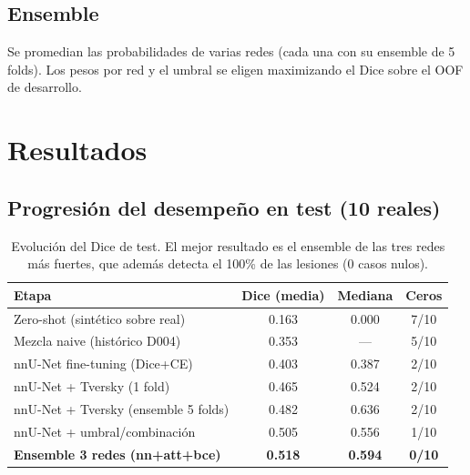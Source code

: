 \documentclass[11pt]{article}
\newcommand{\best}[1]{\textbf{#1}}
\begin{document}
\subsection{Ensemble}
Se promedian las probabilidades de varias redes (cada una con su ensemble de 5 folds).
Los pesos por red y el umbral se eligen maximizando el Dice sobre el OOF de desarrollo.

\section{Resultados}
\subsection{Progresión del desempeño en test (10 reales)}
\begin{table}[H]\centering
\begin{tabular}{lccc}
\toprule
Etapa & Dice (media) & Mediana & Ceros \\
\midrule
Zero-shot (sintético sobre real)        & 0.163 & 0.000 & 7/10 \\
Mezcla naive (histórico D004)            & 0.353 & ---   & 5/10 \\
nnU-Net fine-tuning (Dice+CE)            & 0.403 & 0.387 & 2/10 \\
nnU-Net + Tversky (1 fold)               & 0.465 & 0.524 & 2/10 \\
nnU-Net + Tversky (ensemble 5 folds)     & 0.482 & 0.636 & 2/10 \\
nnU-Net + umbral/combinación             & 0.505 & 0.556 & 1/10 \\
\best{Ensemble 3 redes (nn+att+bce)}     & \best{0.518} & \best{0.594} & \best{0/10} \\
\bottomrule
\end{tabular}
\caption{Evolución del Dice de test. El mejor resultado es el ensemble de las tres
redes más fuertes, que además detecta el 100\% de las lesiones (0 casos nulos).}
\end{table}
\end{document}
